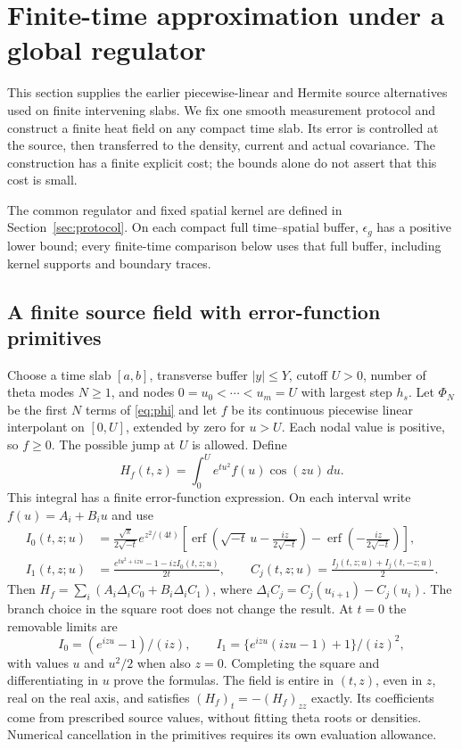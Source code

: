 \section{Finite-time approximation under a global regulator}\label{sec:finite}
This section supplies the earlier piecewise-linear and Hermite source
alternatives used on finite intervening slabs. We fix one smooth measurement protocol and
construct a finite heat field on any compact time slab. Its error is
controlled at the source, then transferred to the density, current and
actual covariance. The construction has a finite explicit cost; the
bounds alone do not assert that this cost is small.

The common regulator and fixed spatial kernel are defined in
Section~\ref{sec:protocol}. On each compact full time--spatial buffer,
$\epsilon_g$ has a positive lower bound; every finite-time comparison
below uses that full buffer, including kernel supports and boundary traces.

\subsection{A finite source field with error-function primitives}
Choose a time slab $[a,b]$, transverse buffer $|y|\le Y$, cutoff $U>0$,
number of theta modes $N\ge1$, and nodes
$0=u_0<\cdots<u_m=U$ with largest step $h_s$.
Let $\Phi_N$ be the first $N$ terms of \eqref{eq:phi} and let $f$
be its continuous piecewise linear interpolant on $[0,U]$, extended
by zero for $u>U$. Each nodal value is positive, so $f\ge0$.
The possible jump at $U$ is allowed. Define
\begin{equation}
 H_f(t,z)=\int_0^U e^{tu^2}f(u)\cos(zu)\,du.
 \label{eq:finitefield}
\end{equation}
This integral has a finite error-function expression.
On each interval write $f(u)=A_i+B_i u$ and use
\begin{align}
 I_0(t,z;u)&=\frac{\sqrt\pi}{2\sqrt{-t}}e^{z^2/(4t)}
 \left[\operatorname{erf}\left(\sqrt{-t}\,u-\frac{iz}{2\sqrt{-t}}\right)
       -\operatorname{erf}\left(-\frac{iz}{2\sqrt{-t}}\right)\right],
 \label{eq:primitive0}\\
 I_1(t,z;u)&=\frac{e^{tu^2+izu}-1-izI_0(t,z;u)}{2t},\qquad
 C_j(t,z;u)=\frac{I_j(t,z;u)+I_j(t,-z;u)}2.
 \label{eq:primitive1}
\end{align}
Then $H_f=\sum_i(A_i\Delta_iC_0+B_i\Delta_iC_1)$, where
$\Delta_iC_j=C_j(u_{i+1})-C_j(u_i)$.
The branch choice in the square root does not change the result.
At $t=0$ the removable limits are
\[
 I_0=(e^{izu}-1)/(iz),\qquad
 I_1=\{e^{izu}(izu-1)+1\}/(iz)^2,
\]
with values $u$ and $u^2/2$ when also $z=0$.
Completing the square and differentiating in $u$ prove the formulas.
The field is entire in $(t,z)$, even in $z$, real on the real axis,
and satisfies $(H_f)_t=-(H_f)_{zz}$ exactly.
Its coefficients come from prescribed source values, without fitting
theta roots or densities. Numerical cancellation in the primitives
requires its own evaluation allowance.

